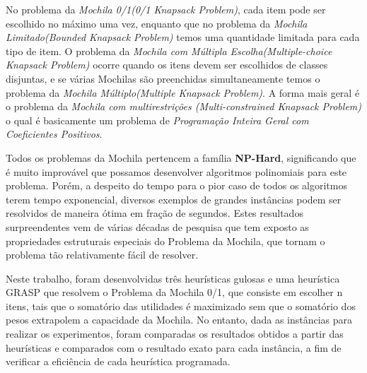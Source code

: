 \documentclass[a4paper, 12pt]{article}
\begin{document}
No problema da \textit{Mochila 0/1(0/1 Knapsack Problem)}, cada item pode ser escolhido no máximo uma vez, 
enquanto que no problema da \textit{Mochila Limitado(Bounded Knapsack Problem)} temos uma quantidade limitada 
para cada tipo de item. O problema da \textit{Mochila com Múltipla Escolha(Multiple-choice Knapsack Problem)}
ocorre quando os itens devem ser escolhidos de classes disjuntas, e se várias Mochilas são preenchidas 
simultaneamente temos o problema da \textit{Mochila Múltiplo(Multiple Knapsack Problem)}. 
A forma mais geral é o problema da \textit{Mochila com multirestrições (Multi-constrained Knapsack Problem)} 
o qual é basicamente um problema de \textit{Programação Inteira Geral com Coeficientes Positivos}.

Todos os problemas da Mochila pertencem a família \textbf{NP-Hard}\cite{pisinger1995algorithms}, significando que
é muito improvável que possamos desenvolver algoritmos polinomiais para este problema. Porém, a 
despeito do tempo para o pior caso de todos os algoritmos terem tempo exponencial, diversos exemplos 
de grandes instâncias podem ser resolvidos de maneira ótima em fração de segundos. 
Estes resultados surpreendentes vem de várias décadas de pesquisa que tem exposto as propriedades 
estruturais especiais do Problema da Mochila, que tornam o problema tão relativamente fácil de resolver.

Neste trabalho, foram desenvolvidas três heurísticas gulosas e uma heurística GRASP que resolvem 
o Problema da Mochila 0/1, que consiste em escolher n itens, tais que o somatório das utilidades é maximizado sem 
que o somatório dos pesos extrapolem a capacidade da Mochila. No entanto, dada as instâncias para realizar
os experimentos, foram comparadas os resultados obtidos a partir das heurísticas e comparados com o resultado
exato para cada instância, a fim de verificar a eficiência de cada heurística programada.


\end{document}

